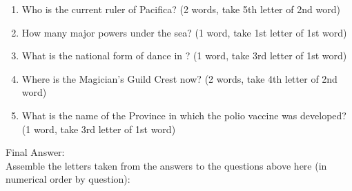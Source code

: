 \documentclass[green]{NeptuneBall}
\begin{document}
\begin{enumerate}
	\item Who is the current ruler of Pacifica? (2 words, take 5th letter of 2nd word) \vspace{3 mm}\\ \underline{\hspace{15cm}}
	\item How many major powers under the sea? (1 word, take 1st letter of 1st word) \vspace{3 mm}\\ \underline{\hspace{15cm}}
	\item What is the national form of dance in \pAtlantis{}? (1 word, take 3rd letter of 1st word) \vspace{3 mm}\\ \underline{\hspace{15cm}}
	\item Where is the Magician's Guild Crest now? (2 words, take 4th letter of 2nd word) \vspace{3 mm}\\ \underline{\hspace{15cm}}
	\item What is the name of the Province in which the polio vaccine was developed? (1 word, take 3rd letter of 1st word) \vspace{3 mm}\\ \underline{\hspace{15cm}} \vspace{10 mm}
\end{enumerate}

{\Large Final Answer:}\\
Assemble the letters taken from the answers to the questions above here (in numerical order by question): \vspace{5 mm}

\underline{\hspace{.5cm}} \underline{\hspace{.5cm}} \underline{\hspace{.5cm}} \underline{\hspace{.5cm}} \underline{\hspace{.5cm}} \underline{\hspace{.5cm}} \underline{\hspace{.5cm}} \underline{\hspace{.5cm}} \underline{\hspace{.5cm}} \underline{\hspace{.5cm}} \underline{\hspace{.5cm}} \underline{\hspace{.5cm}} \underline{\hspace{.5cm}} \underline{\hspace{.5cm}}
\end{document}
